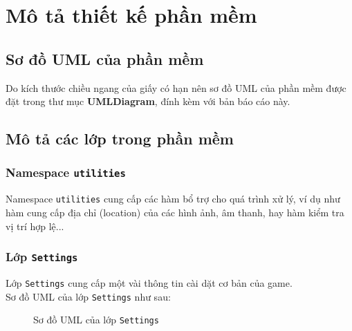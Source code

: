 \section{Mô tả thiết kế phần mềm}
\subsection{Sơ đồ UML của phần mềm}
Do kích thước chiều ngang của giấy có hạn nên sơ đồ UML của phần mềm được đặt trong thư mục \textbf{UMLDiagram}, đính kèm với bản báo cáo này.

\subsection{Mô tả các lớp trong phần mềm}
\subsubsection{Namespace \lstinline{utilities}}
Namespace \lstinline{utilities} cung cấp các hàm bổ trợ cho quá trình xử lý, ví dụ như hàm cung cấp địa chỉ (location) của các hình ảnh, âm thanh, hay hàm kiểm tra vị trí hợp lệ...

\subsubsection{Lớp \lstinline{Settings}}
Lớp \lstinline{Settings} cung cấp một vài thông tin cài dặt cơ bản của game.\\
Sơ đồ UML của lớp \lstinline{Settings} như sau:

\begin{figure}[H]
\caption{Sơ đồ UML của lớp \lstinline{Settings}}
\end{figure} 

